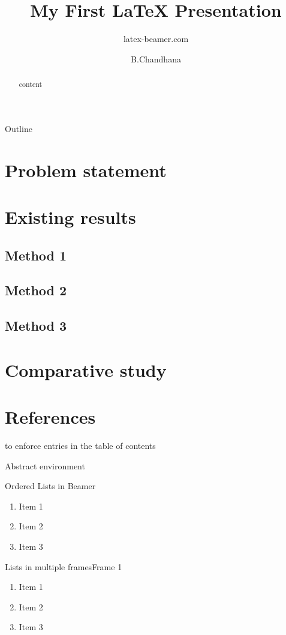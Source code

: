 \documentclass{beamer}
\title{My First \LaTeX{} Presentation}
\author{latex-beamer.com}
\institute{Online Beamer Tutorials}
\author{B.Chandhana}
\begin{document}
\begin{frame}
    \titlepage
\end{frame}

\begin{frame}{Outline}
  \tableofcontents
 \end{frame}

\section{Problem statement}
 \section{Existing results}
   \subsection{Method 1}
   \subsection{Method 2}
   \subsection{Method 3}
\section{Comparative study}
 \section*{References}

 \begin{frame}
 to enforce entries in the table of contents
\end{frame}

 Abstract environment
\begin{abstract}
  content
\end{abstract}

 \begin{frame}{Ordered Lists in Beamer}
\begin{enumerate}
    \item Item 1
    \item Item 2
    \item Item 3
\end{enumerate}
 \end{frame}

\begin{frame}{Lists in multiple frames}{Frame 1}
\begin{enumerate}
    \item Item 1
    \item Item 2
   \item Item 3
   \setcounter{currentenumi}{\theenumi}
\end{enumerate}
 \end{frame}
\end{document}
